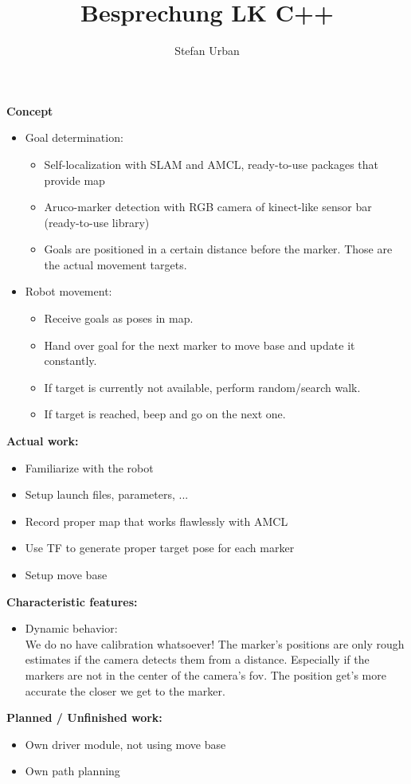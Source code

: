 \documentclass[12pt,a4paper]{report}
\title{Besprechung LK C++}
\author{Stefan Urban}
\begin{document}
\textbf{Concept}

\begin{itemize}
	\item Goal determination:\vspace*{-0.3cm}
		\begin{itemize}
			\itemsep0em
			\item Self-localization with SLAM and AMCL, ready-to-use packages that provide map
			\item Aruco-marker detection with RGB camera of kinect-like sensor bar (ready-to-use library)
			\item Goals are positioned in a certain distance before the marker. Those are the actual movement targets.
		\end{itemize}
	\item Robot movement:\vspace*{-0.3cm}
		\begin{itemize}
			\itemsep0em
			\item Receive goals as poses in map.
			\item Hand over goal for the next marker to move base and update it constantly.
			\item If target is currently not available, perform random/search walk.
			\item If target is reached, beep and go on the next one.
		\end{itemize}
\end{itemize}

\textbf{Actual work:}

\begin{itemize}
	\item Familiarize with the robot
	\item Setup launch files, parameters, ...
	\item Record proper map that works flawlessly with AMCL
	\item Use TF to generate proper target pose for each marker
	\item Setup move base
\end{itemize}

\textbf{Characteristic features:}

\begin{itemize}
	\item Dynamic behavior:\\
			We do no have calibration whatsoever! The marker's positions are only rough estimates if the camera detects them from a distance. Especially if the markers are not in the center of the camera's fov. The position get's more accurate the closer we get to the marker.
\end{itemize}

\textbf{Planned / Unfinished work:}

\begin{itemize}
	\item Own driver module, not using move base
	\item Own path planning
\end{itemize}
\end{document}
